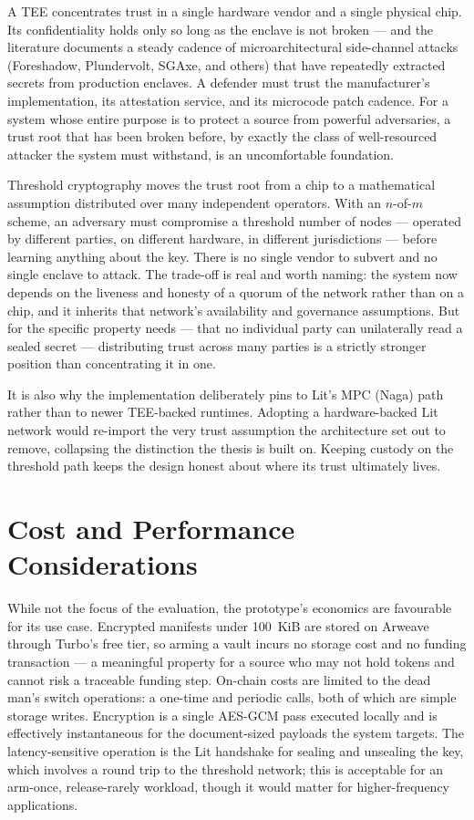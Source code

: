 A TEE concentrates trust in a single hardware vendor and a single physical chip.
Its confidentiality holds only so long as the enclave is not broken --- and the
literature documents a steady cadence of microarchitectural side-channel attacks
(Foreshadow, Plundervolt, SGAxe, and others) that have repeatedly extracted
secrets from production enclaves. A defender must trust the manufacturer's
implementation, its attestation service, and its microcode patch cadence. For a
system whose entire purpose is to protect a source from powerful adversaries, a
trust root that has been broken before, by exactly the class of well-resourced
attacker the system must withstand, is an uncomfortable foundation.

Threshold cryptography moves the trust root from a chip to a mathematical
assumption distributed over many independent operators. With an $n$-of-$m$ scheme,
an adversary must compromise a threshold number of nodes --- operated by different
parties, on different hardware, in different jurisdictions --- before learning
anything about the key. There is no single vendor to subvert and no single enclave
to attack. The trade-off is real and worth naming: the system now depends on the
liveness and honesty of a quorum of the network rather than on a chip, and it
inherits that network's availability and governance assumptions. But for the
specific property \zkw needs --- that no individual party can unilaterally read a
sealed secret --- distributing trust across many parties is a strictly stronger
position than concentrating it in one.

It is also why the implementation deliberately pins to Lit's MPC (Naga) path rather
than to newer TEE-backed runtimes. Adopting a hardware-backed Lit network would
re-import the very trust assumption the architecture set out to remove, collapsing
the distinction the thesis is built on. Keeping custody on the threshold path keeps
the design honest about where its trust ultimately lives.

\section{Cost and Performance Considerations}
\label{sec:eval-cost}

While not the focus of the evaluation, the prototype's economics are favourable for
its use case. Encrypted manifests under 100~KiB are stored on Arweave through
Turbo's free tier, so arming a vault incurs no storage cost and no funding
transaction --- a meaningful property for a source who may not hold tokens and cannot
risk a traceable funding step. On-chain costs are limited to the dead man's switch
operations: a one-time  and periodic  calls, both
of which are simple storage writes. Encryption is a single AES-GCM pass executed
locally and is effectively instantaneous for the document-sized payloads the system
targets. The latency-sensitive operation is the Lit handshake for sealing and
unsealing the key, which involves a round trip to the threshold network; this is
acceptable for an arm-once, release-rarely workload, though it would matter for
higher-frequency applications.

